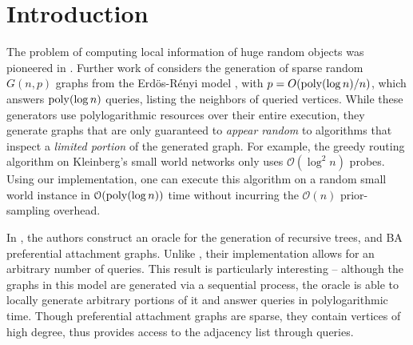\section{Introduction}

The problem of computing local information of huge random objects was pioneered in \cite{huge_old,huge}.
Further work of \cite{sparse} considers the generation of sparse random $G(n,p)$ graphs from the Erd\"{o}s-R\'{e}nyi model \cite{er},
with $p = O(\mathrm{poly}(\log n)/n)$, which answers $\mathrm{poly}(\log n)$  queries, listing the neighbors of queried vertices.
While these generators use polylogarithmic resources over their entire execution,
they generate graphs that are  only guaranteed to {\em appear random} to algorithms that inspect a {\em limited portion} of the generated graph.
For example, the greedy routing algorithm on Kleinberg's small world networks \cite{kleinberg} only uses $\mathcal O(\log^2 n)$ probes.
Using our implementation, one can execute this algorithm on a random small world instance
in $\mathcal O(\mathrm{poly}(\log n))$ time without incurring the $\mathcal O(n)$ prior-sampling overhead.

In \cite{reut}, the authors construct an oracle for the generation of recursive trees, and BA preferential attachment graphs.
Unlike \cite{sparse}, their implementation allows for an arbitrary number of queries.
This result is particularly interesting --  although the graphs in this model are generated via a sequential process,
the oracle is able to locally generate arbitrary portions of it and answer queries in polylogarithmic time.
Though preferential attachment graphs are sparse, they contain vertices of high degree,
thus \cite{reut} provides access to the adjacency list through  queries.



